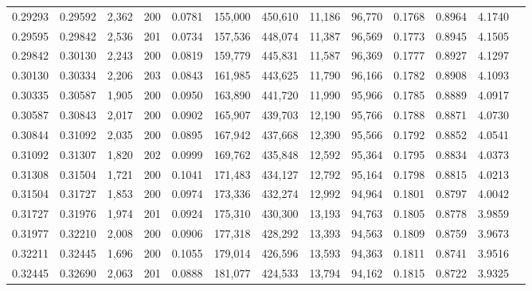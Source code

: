 \begin{tabular}{rrrrrrrrrrrrr}
0.29293 & 0.29592 & 2,362 & 200 &                                     0.0781 & 155,000 & 450,610 &  11,186 &  96,770 & 0.1768 & 0.8964 & 4.1740 \\
0.29595 & 0.29842 & 2,536 & 201 &                                     0.0734 & 157,536 & 448,074 &  11,387 &  96,569 & 0.1773 & 0.8945 & 4.1505 \\
0.29842 & 0.30130 & 2,243 & 200 &                                     0.0819 & 159,779 & 445,831 &  11,587 &  96,369 & 0.1777 & 0.8927 & 4.1297 \\
0.30130 & 0.30334 & 2,206 & 203 &                                     0.0843 & 161,985 & 443,625 &  11,790 &  96,166 & 0.1782 & 0.8908 & 4.1093 \\
0.30335 & 0.30587 & 1,905 & 200 &                                     0.0950 & 163,890 & 441,720 &  11,990 &  95,966 & 0.1785 & 0.8889 & 4.0917 \\
0.30587 & 0.30843 & 2,017 & 200 &                                     0.0902 & 165,907 & 439,703 &  12,190 &  95,766 & 0.1788 & 0.8871 & 4.0730 \\
0.30844 & 0.31092 & 2,035 & 200 &                                     0.0895 & 167,942 & 437,668 &  12,390 &  95,566 & 0.1792 & 0.8852 & 4.0541 \\
0.31092 & 0.31307 & 1,820 & 202 &                                     0.0999 & 169,762 & 435,848 &  12,592 &  95,364 & 0.1795 & 0.8834 & 4.0373 \\
0.31308 & 0.31504 & 1,721 & 200 &                                     0.1041 & 171,483 & 434,127 &  12,792 &  95,164 & 0.1798 & 0.8815 & 4.0213 \\
0.31504 & 0.31727 & 1,853 & 200 &                                     0.0974 & 173,336 & 432,274 &  12,992 &  94,964 & 0.1801 & 0.8797 & 4.0042 \\
0.31727 & 0.31976 & 1,974 & 201 &                                     0.0924 & 175,310 & 430,300 &  13,193 &  94,763 & 0.1805 & 0.8778 & 3.9859 \\
0.31977 & 0.32210 & 2,008 & 200 &                                     0.0906 & 177,318 & 428,292 &  13,393 &  94,563 & 0.1809 & 0.8759 & 3.9673 \\
0.32211 & 0.32445 & 1,696 & 200 &                                     0.1055 & 179,014 & 426,596 &  13,593 &  94,363 & 0.1811 & 0.8741 & 3.9516 \\
0.32445 & 0.32690 & 2,063 & 201 &                                     0.0888 & 181,077 & 424,533 &  13,794 &  94,162 & 0.1815 & 0.8722 & 3.9325 \\

\end{tabular}
